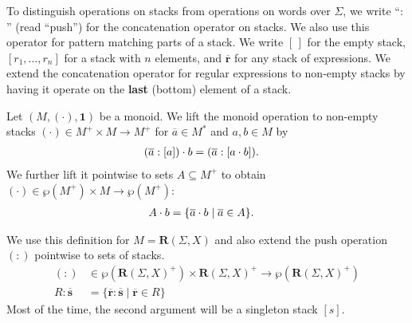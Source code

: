 \documentclass[runningheads, envcountsame, a4paper]{llncs}
\newcommand\Power{\wp}
\newcommand\Rempty{\mathbf1}
\newcommand\Reg{\mathbf{R}}
\newcommand\PUSH{:}
\newcommand\EMPTY{[\,]}
\newcommand\SINGLETON[1]{{[#1]}}
\newcommand\RS{\ensuremath{\overline{\mathbf{r}}}}
\renewcommand\SS{\ensuremath{\overline{\mathbf{s}}}}
\begin{document}
To distinguish operations on stacks
from operations on words over $\Sigma$, we write ``$\PUSH$'' (read ``push'') for the concatenation operator on
stacks. We also use this operator for pattern matching parts of a
stack. We write $\EMPTY$ for the empty stack,
$\SINGLETON{r_1, \dots, r_n}$ for a stack with
$n$ elements, and $\RS$ for any stack of expressions.
We extend the concatenation operator for regular expressions to non-empty
stacks by having it operate on the \textbf{last} (bottom) element of a
stack.
\begin{definition}
  Let $(M, (\cdot), \Rempty)$ be a monoid.
  We lift the monoid operation to non-empty stacks $(\cdot) \in M^+ \times M  \to M^+$ 
  for $\overline{a} \in M^*$ and $a, b \in M$ by
  \begin{align*}
    (\overline{a} \PUSH \SINGLETON{a}) \cdot b
    &= (\overline{a} \PUSH \SINGLETON{a \cdot b})
      \text.
  \end{align*}
  We further lift it pointwise to sets $A \subseteq M^+$ to obtain $(\cdot)\in \Power(M^+)
  \times M \to \Power(M^+)$:
  \begin{align*}
    A \cdot b &= \{ \overline{a} \cdot b \mid \overline{a} \in A \}
                \text.
  \end{align*}
\end{definition}
We use this definition for $M= \Reg (\Sigma,X)$ and also extend the
push operation $(:)$ pointwise to sets of stacks.
\begin{align*}
  (\PUSH) &\in \Power(\Reg (\Sigma,X)^+) \times \Reg (\Sigma,X)^+ \to \Power(\Reg (\Sigma,X)^+) \\
  R \PUSH \SS &= \{ \RS  \PUSH \SS \mid \RS \in R \}
\end{align*}
Most of the time, the second argument will be a singleton stack $\SINGLETON{s}$.
\end{document}
